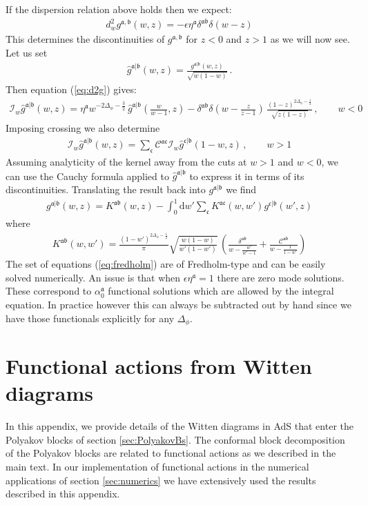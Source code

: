 \documentclass[12pt]{article}
\numberwithin{equation}{section}
\newcommand{\reef}[1]{(\ref{#1})}
\newcommand{\bea}{\begin{eqnarray}}
\newcommand{\eea}{\end{eqnarray}}
\newcommand{\ud}{\mathrm d}
\newcommand{\Df}{{\Delta_\phi}}
\newcommand{\mf}[1]{\mathfrak #1}
\begin{document}
	If the dispersion relation above holds then we expect:
	\bea
	d^2_w g^{\mf a, \mf b}(w,z)=-\epsilon \eta^{\mf a}\delta^{\mf a\mf b} \delta(w-z) \label{eq:d2g}
	\eea
	This determines the discontinuities of $g^{\mf a, \mf b}$ for $z<0$ and $z>1$ as we will now see. Let us set
	\bea
	\hat g^{\mf a|\mf b}(w,z)=\frac{g^{\mf a|\mf b}(w,z)}{\sqrt{w(1-w)}}\,.
	\eea
	Then equation \reef{eq:d2g} gives:
	\bea
	\mathcal I_w \hat g^{\mf a|\mf b}(w,z)=\eta^{\mf a} w^{-2\Df-\frac 32}\, \hat g^{\mf a|\mf b}(\mbox{$\frac{w}{w-1}$},z)-\delta^{\mf a\mf b}\delta(w-\mbox{$\frac z{z-1}$})\,\frac{(1-z)^{2\Df-\frac 12}}{\sqrt{z(1-z)}}\,, \qquad w<0
	\eea
	Imposing crossing we also determine
	\bea
	\mathcal I_w \hat g^{\mf a|\mf b}(w,z)=\sum_{\mf c} \mathcal C^{\mf a\mf c} \mathcal I_w \hat g^{\mf c|\mf b}(1-w,z)\,, \qquad w>1
	\eea
	Assuming analyticity of the kernel away from the cuts at $w>1$ and $w<0$, we can use the Cauchy formula applied to $\hat g^{\mf a|\mf b}$ to express it in terms of its discontinuities. Translating the result back into $g^{\mf a|\mf b}$ we find
	\bea
	g^{\mf a|\mf b}(w,z)=K^{\mf a\mf b}(w,z)-\int_0^1 \ud w' \sum_{\mf c} K^{\mf a\mf c}(w,w') g^{\mf c|\mf b}(w',z) \label{eq:fredholm}
	\eea
	where 
	\bea
	K^{\mf a\mf b}(w,w')=\frac{(1-w')^{2\Df-\frac 12}}{\pi} \sqrt{\frac{w(1-w)}{w'(1-w')}}\,\left( \frac{\delta^{\mf a\mf b}}{w-\frac{w'}{w'-1}}+\frac{\mathcal C^{\mf a\mf b}}{w-\frac{1}{1-w'}}\right)
	\eea
	The set of equations \reef{eq:fredholm} are of Fredholm-type and can be easily solved numerically. An issue is that when $\epsilon \eta^{\mf a}=1$ there are zero mode solutions. These correspond to $\alpha_0^{\mf a}$ functional solutions which are allowed by the integral equation. In practice however this can always be subtracted out by hand since we have those functionals explicitly for any $\Df$.
	
	
	
\section{Functional actions from Witten diagrams}
\label{app:witten}

In this appendix, we provide details of the Witten diagrams in AdS that enter the Polyakov blocks of section \ref{sec:PolyakovBs}. The conformal block decomposition of the Polyakov blocks are related to functional actions as we described in the main text.  In our implementation of functional actions in the numerical applications of section \ref{sec:numerics} we have extensively used the results described in this appendix.		
\end{document}
